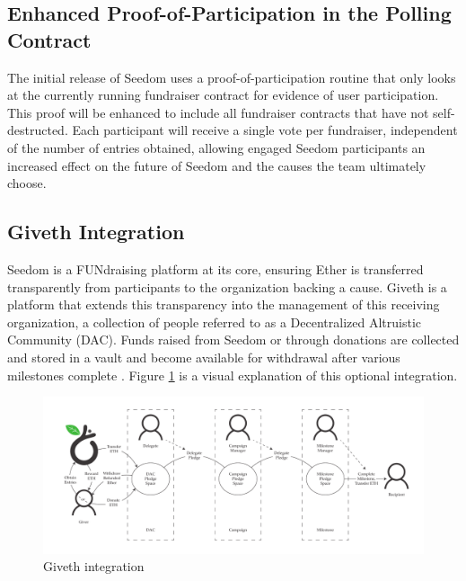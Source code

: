 \documentclass[11pt]{article}
\begin{document}
\subsection{Enhanced Proof-of-Participation in the Polling Contract}
\label{sec:enhancedProofOfParticipationInThePollingContract}

The initial release of Seedom uses a proof-of-participation routine that only looks at the currently running fundraiser contract for evidence of user participation. This proof will be enhanced to include all fundraiser contracts that have not self-destructed. Each participant will receive a single vote per fundraiser, independent of the number of entries obtained, allowing engaged Seedom participants an increased effect on the future of Seedom and the causes the team ultimately choose.

\subsection{Giveth Integration}

Seedom is a FUNdraising platform at its core, ensuring Ether is transferred transparently from participants to the organization backing a cause. Giveth is a platform that extends this transparency into the management of this receiving organization, a collection of people referred to as a Decentralized Altruistic Community (DAC). Funds raised from Seedom or through donations are collected and stored in a vault and become available for withdrawal after various milestones complete \cite{11}. Figure \ref{figure:givethIntegration} is a visual explanation of this optional integration.

\begin{figure}[H]
\begin{center}
\includegraphics[width=1.0\textwidth]{./graphics/giveth-integration.pdf}
\caption{Giveth integration \cite{11}}
\label{figure:givethIntegration}
\end{center}
\end{figure}
\end{document}
